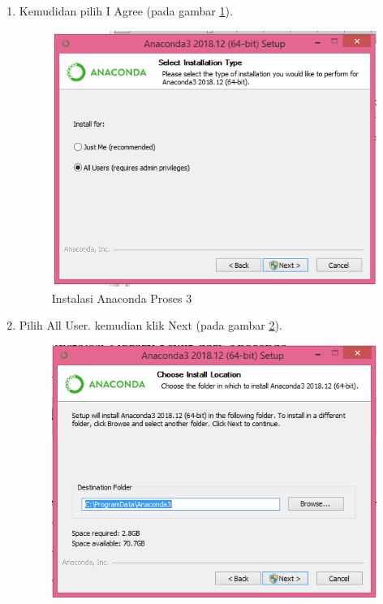 \begin{enumerate}
\begin{figure}[h]
	  \caption{Instalasi Anaconda Proses 2}
	  \label{labelgambar3}
	  \end{figure}
  \item Kemudidan pilih I Agree (pada gambar \ref{labelgambar3}).
\begin{figure}[h!]
	  \centering
	  \includegraphics[scale=0.4]{figures/instal/3.PNG}
	  \caption{Instalasi Anaconda Proses 3}
	  \label{labelgambar4}
	  \end{figure}
  \item Pilih All User. kemudian klik Next (pada gambar \ref{labelgambar4}).
\begin{figure}[h!]
	  \centering
	  \includegraphics[scale=0.4]{figures/instal/4.PNG}

\end{figure}
\end{enumerate}

